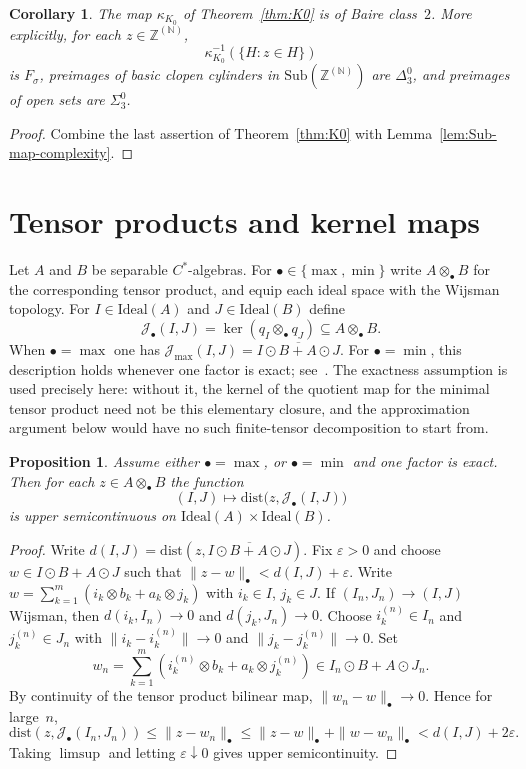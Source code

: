 \documentclass[12pt,fleqn,a4paper]{amsart}
\renewcommand{\le}{\leqslant}
\numberwithin{equation}{section}
\newtheorem{corollary}[theorem]{Corollary}
\newtheorem{proposition}[theorem]{Proposition}
\theoremstyle{definition}
\newcommand{\N}{\mathbb{N}}
\newcommand{\Z}{\mathbb{Z}}
\newcommand{\Ideal}{\mathrm{Ideal}}
\newcommand{\dist}{\mathrm{dist}}
\newcommand{\Sub}{\mathrm{Sub}}
\begin{document}
\begin{corollary}
\label{cor:K0-map-complexity}
The map $\kappa_{K_0}$ of Theorem~\ref{thm:K0} is of Baire class~$2$.
More explicitly, for each $z\in \Z^{(\N)}$,
\[
\kappa_{K_0}^{-1}(\{H:z\in H\})
\]
is $F_\sigma$, preimages of basic clopen cylinders in $\Sub(\Z^{(\N)})$ are
$\Delta^0_3$, and preimages of open sets are $\Sigma^0_3$.
\end{corollary}

\begin{proof}
Combine the last assertion of Theorem~\ref{thm:K0} with
Lemma~\ref{lem:Sub-map-complexity}.
\end{proof}

\section{Tensor products and kernel maps}\label{sec:tensor-products}

Let $A$ and $B$ be separable $C^*$-algebras.  For
$\bullet\in\{\max,\min\}$ write $A\otimes_\bullet B$ for the corresponding
tensor product, and equip each ideal space with the Wijsman topology.
For $I\in\Ideal(A)$ and $J\in\Ideal(B)$ define
\[
\mathcal J_\bullet(I,J)=\ker(q_I\otimes_\bullet q_J)\subseteq A\otimes_\bullet B.
\]
When $\bullet=\max$ one has
$\mathcal J_{\max}(I,J)=\overline{I\odot B+A\odot J}$.
For $\bullet=\min$, this description holds whenever one factor is exact;
see~\cite[Prop.~2.3.3]{BrownOzawa}.  The exactness assumption is used precisely here:
without it, the kernel of the quotient map for the minimal tensor product need not be
this elementary closure, and the approximation argument below would have no such
finite-tensor decomposition to start from.

\begin{proposition}\label{prop:tensor-usc}
Assume either $\bullet=\max$, or $\bullet=\min$ and one factor is exact.
Then for each $z\in A\otimes_\bullet B$ the function
\[
(I,J)\longmapsto\dist\bigl(z,\mathcal J_\bullet(I,J)\bigr)
\]
is upper semicontinuous on $\Ideal(A)\times\Ideal(B)$.
\end{proposition}

\begin{proof}
Write $d(I,J)=\dist(z,\overline{I\odot B+A\odot J})$.  Fix $\varepsilon>0$ and choose
$w\in I\odot B+A\odot J$ such that $\|z-w\|_\bullet<d(I,J)+\varepsilon$.
Write
$w=\sum_{k=1}^m(i_k\otimes b_k+a_k\otimes j_k)$
with $i_k\in I$, $j_k\in J$.
If $(I_n,J_n)\to(I,J)$ Wijsman, then $d(i_k,I_n)\to 0$ and $d(j_k,J_n)\to 0$.
Choose $i_k^{(n)}\in I_n$ and $j_k^{(n)}\in J_n$ with $\|i_k-i_k^{(n)}\|\to 0$
and $\|j_k-j_k^{(n)}\|\to 0$.  Set
\[
w_n=\sum_{k=1}^m(i_k^{(n)}\otimes b_k+a_k\otimes j_k^{(n)})\in I_n\odot B+A\odot J_n.
\]
By continuity of the tensor product bilinear map, $\|w_n-w\|_\bullet\to 0$.
Hence for large~$n$,
\[
\dist(z,\mathcal J_\bullet(I_n,J_n))\le\|z-w_n\|_\bullet
\le\|z-w\|_\bullet+\|w-w_n\|_\bullet<d(I,J)+2\varepsilon.
\]
Taking $\limsup$ and letting $\varepsilon\downarrow 0$ gives upper semicontinuity.
\end{proof}
\end{document}
